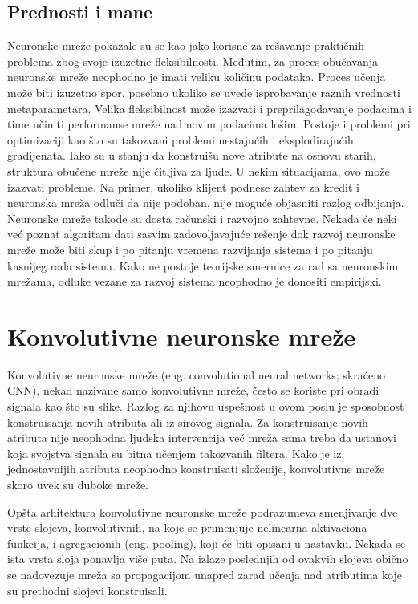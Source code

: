 \subsection{Prednosti i mane}

Neuronske mreže pokazale su se kao jako korisne za rešavanje praktičnih problema zbog svoje izuzetne fleksibilnosti. Međutim, za proces obučavanja neuronske mreže neophodno je imati veliku količinu podataka. Proces učenja može biti izuzetno spor, posebno ukoliko se uvede isprobavanje raznih vrednosti metaparametara. Velika fleksibilnost može izazvati i preprilagođavanje podacima i time učiniti performanse mreže nad novim podacima lošim. Postoje i problemi pri optimizaciji kao što su takozvani problemi nestajućih i eksplodirajućih gradijenata. Iako su u stanju da konstruišu nove atribute na osnovu starih, struktura obučene mreže nije čitljiva za ljude. U nekim situacijama, ovo može izazvati probleme. Na primer, ukoliko klijent podnese zahtev za kredit i neuronska mreža odluči da nije podoban, nije moguće objasniti razlog odbijanja. Neuronske mreže takođe su dosta računski i razvojno zahtevne. Nekada će neki već poznat algoritam dati sasvim zadovoljavajuće rešenje dok razvoj neuronske mreže može biti skup i po pitanju vremena razvijanja sistema i po pitanju kasnijeg rada sistema. 
Kako ne postoje teorijske smernice za rad sa neuronskim mrežama, odluke vezane za razvoj sistema neophodno je donositi empirijski.

\section{Konvolutivne neuronske mreže}

Konvolutivne neuronske mreže (eng. convolutional neural networks; skraćeno CNN), nekad nazivane samo konvolutivne mreže, često se koriste pri obradi signala kao što su slike. Razlog za njihovu uspešnost u ovom poslu je sposobnost konstruisanja novih atributa ali iz sirovog signala. Za konstruisanje novih atributa nije neophodna ljudska intervencija već mreža sama treba da ustanovi koja svojstva signala su bitna učenjem takozvanih filtera. Kako je iz jednostavnijih atributa neophodno konstruisati složenije, konvolutivne mreže skoro uvek su duboke mreže.
\par 
Opšta arhitektura konvolutivne neuronske mreže podrazumeva smenjivanje dve vrste slojeva, konvolutivnih, na koje se primenjuje nelinearna aktivaciona funkcija, i agregacionih (eng. pooling), koji će biti opisani u nastavku. Nekada se ista vrsta sloja ponavlja više puta. Na izlaze poslednjih od ovakvih slojeva obično se nadovezuje mreža sa propagacijom unapred zarad učenja nad atributima koje su prethodni slojevi konstruisali. 


